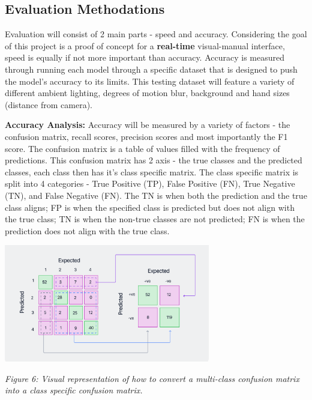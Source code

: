\documentclass[11pt]{article}
\def\paraskip{\vskip 0.4cm}
\begin{document}
    \subsection{Evaluation Methodations}
        Evaluation will consist of 2 main parts - speed and accuracy. Considering the goal of this project is a proof of concept for a \textbf{real-time} visual-manual interface, speed is equally if not more important than accuracy. Accuracy is measured through running each model through a specific dataset that is designed to push the model's accuracy to its limits. This testing dataset will feature a variety of different ambient lighting, degrees of motion blur, background and hand sizes (distance from camera). 

        \paraskip

        \noindent\textbf{Accuracy Analysis: } Accuracy will be measured by a variety of factors - the confusion matrix, recall scores, precision scores and most importantly the F1 score. The confusion matrix is a table of values filled with the frequency of predictions. This confusion matrix has 2 axis - the true classes and the predicted classes, each class then has it's class specific matrix. The class specific matrix is split into 4 categories - True Positive (TP), False Positive (FN), True Negative (TN), and False Negative (FN). The TN is when both the prediction and the true class aligns; FP is when the specified class is predicted but does not align with the true class; TN is when the non-true classes are not predicted; FN is when the prediction does not align with the true class.

        \begin{center}
            \includegraphics[width=9cm]{images/confusionclass.png}
            \\
            \raggedright \textit{
            Figure 6: Visual representation of how to convert a multi-class confusion matrix into a class specific confusion matrix.
            }
        \end{center}
\end{document}

